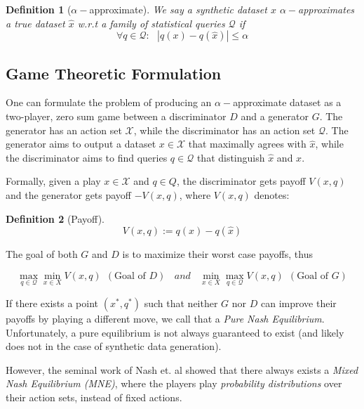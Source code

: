 \documentclass[]{article}
\newcommand{\X}{\mathcal{X}}
\newcommand{\Q}{\mathcal{Q}}
\newtheorem{definition}{Definition}[section]
\theoremstyle{definition}
\begin{document}
\begin{definition}[$\alpha-$approximate]
    We say a synthetic dataset $x$ $\alpha-$approximates a true dataset $\hat x$ w.r.t a family of statistical queries $\Q$ if
    \begin{equation}
        \forall q \in \Q: ~~~ |q(x) - q(\hat x)| \leq \alpha
    \end{equation}
\end{definition}

\subsection{Game Theoretic Formulation}

One can formulate the problem of producing an $\alpha-$approximate dataset as a two-player, zero sum game \cite{HRU13} between a discriminator $D$ and a generator $G$. The generator has an action set $\X$, while the discriminator has an action set $\Q$. The generator aims to output a dataset $x \in \X$ that maximally agrees with $\hat x$, while the discriminator aims to find queries $q \in \Q$ that distinguish $\hat x$ and $x$.

Formally, given a play $x \in \X$ and $q \in Q$, the discriminator gets payoff $V(x,q)$ and the generator gets payoff $-V(x,q)$, where $V(x,q)$ denotes:

\begin{definition}[Payoff]
    \begin{equation}
        V(x,q) := q(x) - q(\hat x)
    \end{equation}
\end{definition}

The goal of both $G$ and $D$ is to maximize their worst case payoffs, thus

\begin{equation}
    \max_{q \in \Q} \min_{x \in X} V(x,q) ~~ (\text{Goal of } D) ~~~~ and ~~~~ 
    \min_{x \in X} \max_{q \in \Q} V(x,q) ~~ (\text{Goal of } G) 
\end{equation}

If there exists a point $(x^*, q^*)$ such that neither $G$ nor $D$ can improve their payoffs by playing a different move, we call that a \emph{Pure Nash Equilibrium}. Unfortunately, a pure equilibrium is not always guaranteed to exist (and likely does not in the case of synthetic data generation). 

However, the seminal work of Nash et. al showed that there always exists a \emph{Mixed Nash Equilibrium (MNE)}, where the players play \emph{probability distributions} over their action sets, instead of fixed actions. 
\end{document}
